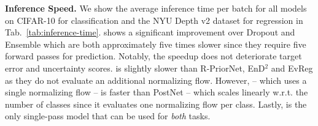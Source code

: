 \textbf{Inference Speed.} We show the average inference time per batch for all models on CIFAR-10 for classification and the NYU Depth v2 dataset for regression in Tab.~\ref{tab:inference-time}. \NatPNacro{} shows a significant improvement over Dropout and Ensemble which are both approximately five times slower since they require five forward passes for prediction. Notably, the \NatPNacro{} speedup does not deteriorate target error and uncertainty scores. \NatPNacro{} is slightly slower than R-PriorNet, EnD$^2$ and EvReg as they do not evaluate an additional normalizing flow. However, \NatPNacro{} -- which uses a single normalizing flow -- is faster than PostNet -- which scales linearly w.r.t. the number of classes since it evaluates one normalizing flow per class. Lastly, \NatPNacro{} is the only single-pass model that can be used for \emph{both} tasks.

